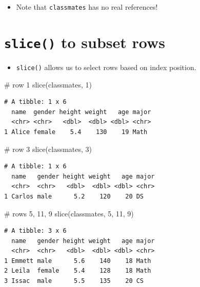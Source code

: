 \documentclass[
  letterpaper,
  DIV=11,
  numbers=noendperiod]{scrreprt}
\newenvironment{Shaded}{\begin{snugshade}}{\end{snugshade}}
\newcommand{\CommentTok}[1]{\textcolor[rgb]{0.37,0.37,0.37}{#1}}
\newcommand{\DecValTok}[1]{\textcolor[rgb]{0.68,0.00,0.00}{#1}}
\newcommand{\FunctionTok}[1]{\textcolor[rgb]{0.28,0.35,0.67}{#1}}
\newcommand{\NormalTok}[1]{\textcolor[rgb]{0.00,0.23,0.31}{#1}}
\providecommand{\tightlist}{%
  \setlength{\itemsep}{0pt}\setlength{\parskip}{0pt}}\usepackage{longtable,booktabs,array}
\begin{document}
\begin{itemize}
\tightlist
\item
  Note that \texttt{classmates} has no real references!
\end{itemize}

\section{\texorpdfstring{\texttt{slice()} to subset
rows}{slice() to subset rows}}\label{slice-to-subset-rows}

\begin{itemize}
\tightlist
\item
  \texttt{slice()} allows us to select rows based on index position.
\end{itemize}

\begin{Shaded}
\begin{Highlighting}[]
\CommentTok{\# row 1}
\FunctionTok{slice}\NormalTok{(classmates, }\DecValTok{1}\NormalTok{)}
\end{Highlighting}
\end{Shaded}

\begin{verbatim}
# A tibble: 1 x 6
  name  gender height weight   age major
  <chr> <chr>   <dbl>  <dbl> <dbl> <chr>
1 Alice female    5.4    130    19 Math 
\end{verbatim}

\begin{Shaded}
\begin{Highlighting}[]
\CommentTok{\# row 3}
\FunctionTok{slice}\NormalTok{(classmates, }\DecValTok{3}\NormalTok{)}
\end{Highlighting}
\end{Shaded}

\begin{verbatim}
# A tibble: 1 x 6
  name   gender height weight   age major
  <chr>  <chr>   <dbl>  <dbl> <dbl> <chr>
1 Carlos male      5.2    120    20 DS   
\end{verbatim}

\begin{Shaded}
\begin{Highlighting}[]
\CommentTok{\# rows 5, 11, 9}
\FunctionTok{slice}\NormalTok{(classmates, }\DecValTok{5}\NormalTok{, }\DecValTok{11}\NormalTok{, }\DecValTok{9}\NormalTok{)}
\end{Highlighting}
\end{Shaded}

\begin{verbatim}
# A tibble: 3 x 6
  name   gender height weight   age major
  <chr>  <chr>   <dbl>  <dbl> <dbl> <chr>
1 Emmett male      5.6    140    18 Math 
2 Leila  female    5.4    128    18 Math 
3 Issac  male      5.5    135    20 CS   
\end{verbatim}
\end{document}

